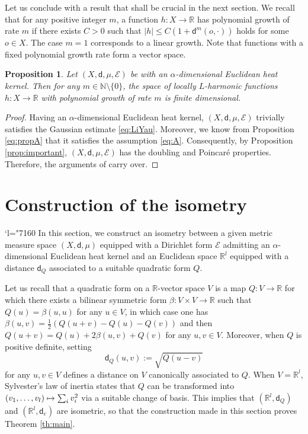 \documentclass[JEP,XML,SOM,Unicode,published]{cedram}
\newcommand\mto{\mathchoice{\longmapsto}{\mapsto}{\mapsto}{\mapsto}}
\let\backslash\setminus
\newcommand{\Changel}{\mathcode`l="7160}
\theoremstyle{plain}
\newtheorem{proposition}[theorem]{Proposition}
\theoremstyle{definition}
\newcommand{\setN}{\mathbb{N}}
\newcommand{\setR}{\mathbb{R}}
\newcommand{\cE}{\mathcal{E}}
\newcommand{\dist}{\mathsf{d}}
\begin{document}
Let us conclude with a result that shall be crucial in the next section. We recall that for any positive integer $m$, a function $h:X \to \setR$ has polynomial growth of rate $m$ if there exists $C>0$ such that $|h|\le C(1+\dist^m(o,\cdot))$ holds for some $o \in X$. The case $m=1$ corresponds to a linear growth. Note that functions with a fixed polynomial growth rate form a vector space.

\begin{proposition}\label{prop:finitedim}
Let $(X,\dist,\mu,\cE)$ be with an $\alpha$-dimensional Euclidean heat kernel. Then for any $m \in \setN\backslash \{0\}$, the space of locally $L$-harmonic functions $h:X\to\setR$ with polynomial growth of rate $m$ is finite dimensional.
\end{proposition}

\begin{proof}
Having an $\alpha$-dimensional Euclidean heat kernel, $(X,\dist,\mu,\cE)$ trivially satisfies the Gaussian estimate \eqref{eq:LiYau}. Moreover, we know from Proposition \ref{eq:propA} that it satisfies the assumption \eqref{eq:A}. Consequently, by Proposition \ref{prop:important}, $(X,\dist,\mu,\cE)$ has the doubling and Poincaré properties. Therefore, the arguments of \cite{ColdingMinicozzi} carry over.
\end{proof}

\section{Construction of the isometry}\label{sec:4}
\Changel
In this section, we construct an isometry between a given metric measure space $(X,\dist,\mu)$ equipped with a Dirichlet form $\cE$ admitting an $\alpha$-dimensional Euclidean heat kernel and an Euclidean space $\setR^l$ equipped with a distance $\dist_Q$ associated to a suitable quadratic form $Q$.

Let us recall that a quadratic form on a $\setR$-vector space $V$ is a map $Q: V \to \setR$ for which there exists a bilinear symmetric form $\beta: V \times V \to\setR$ such that $Q(u)=\beta(u,u)$ for any $u \in V$, in which case one has
$\beta(u,v)=\frac{1}{2}(Q(u+v)-Q(u)-Q(v))$ and then
$Q(u+v)=Q(u) +2\beta(u,v) + Q(v)$ for any $u,v \in V$. Moreover, when $Q$ is positive definite, setting\begin{equation}\label{eq:dist_Q}\dist_Q(u,v):=\sqrt{Q(u-v)}\end{equation} for any $u,v \in V$ defines a distance on $V$ canonically associated to $Q$. When $V=\setR^l$, Sylvester's law of inertia states that $Q$ can be transformed into $(v_1,\ldots,v_l) \mto \sum_i v_i^2$ via a suitable change of basis. This implies that $(\setR^l,\dist_Q)$ and $(\setR^l,\dist_e)$ are isometric, so that the construction made in this section proves Theorem \ref{th:main}.
\end{document}
